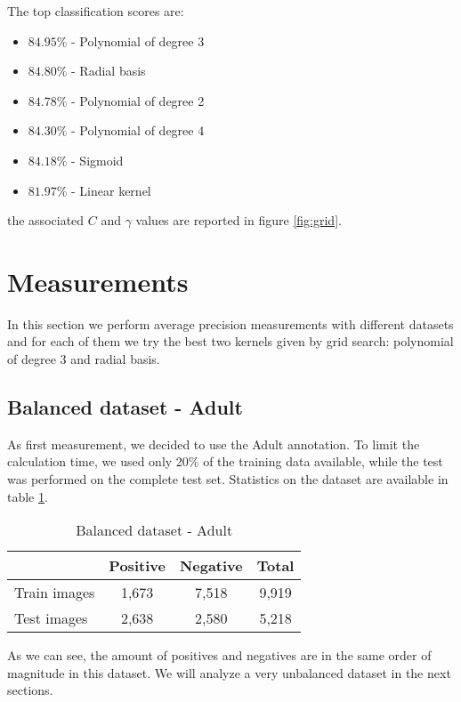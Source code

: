 The top classification scores are:
\begin{itemize}\itemsep0.5pt
    \item $84.95\%$ - Polynomial of degree 3
    \item $84.80\%$ - Radial basis
    \item $84.78\%$ - Polynomial of degree 2
    \item $84.30\%$ - Polynomial of degree 4
    \item $84.18\%$ - Sigmoid
    \item $81.97\%$ - Linear kernel
\end{itemize}
the associated $C$ and $\gamma$ values are reported in figure \ref{fig:grid}.

\section{Measurements}

In this section we perform average precision measurements with different
datasets and for each of them we try the best two kernels given by grid search:
polynomial of degree 3 and radial basis.

\subsection{Balanced dataset - Adult}

As first measurement, we decided to use the Adult annotation. To limit the
calculation time, we used only 20\% of the training data available, while the
test was performed on the complete test set. Statistics on the dataset are
available in table \ref{table:ds1}.

\begin{table}[htbp]
\caption{Balanced dataset - Adult}
\centering
\begin{tabular}{l|cc|c}
       ~            & Positive & Negative & Total  \\
    \midrule                                     
    Train images    & 1,673 & 7,518       & 9,919  \\
    Test images     & 2,638 & 2,580       & 5,218  \\
\end{tabular}
\label{table:ds1}
\end{table}

As we can see, the amount of positives and negatives are in the same order of
magnitude in this dataset. We will analyze a very unbalanced dataset in the next
sections.

